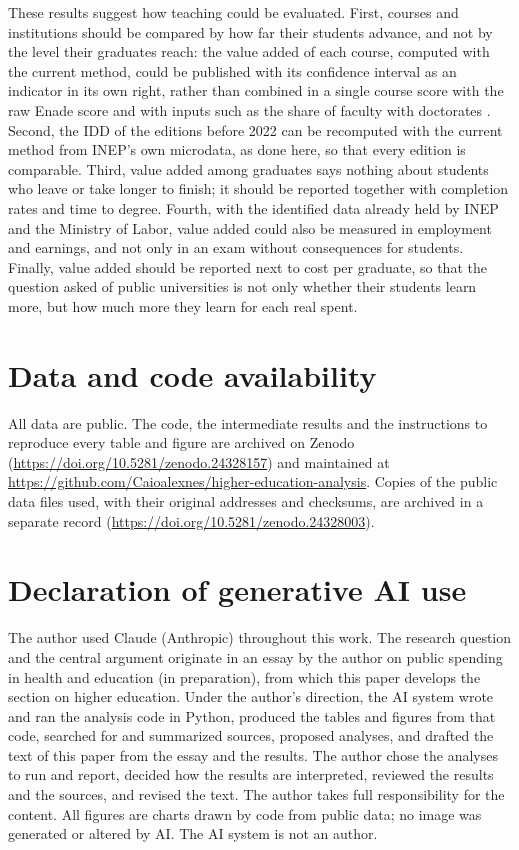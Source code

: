 \documentclass[12pt,letterpaper]{article}
\begin{document}
These results suggest how teaching could be evaluated. First, courses and institutions should be compared by how far their students advance, and not by the level their graduates reach: the value added of each course, computed with the current method, could be published with its confidence interval as an indicator in its own right, rather than combined in a single course score with the raw Enade score and with inputs such as the share of faculty with doctorates \citep{inep2023cpc}. Second, the IDD of the editions before 2022 can be recomputed with the current method from INEP's own microdata, as done here, so that every edition is comparable. Third, value added among graduates says nothing about students who leave or take longer to finish; it should be reported together with completion rates and time to degree. Fourth, with the identified data already held by INEP and the Ministry of Labor, value added could also be measured in employment and earnings, and not only in an exam without consequences for students. Finally, value added should be reported next to cost per graduate, so that the question asked of public universities is not only whether their students learn more, but how much more they learn for each real spent.

\section*{Data and code availability}
All data are public. The code, the intermediate results and the instructions to reproduce every table and figure are archived on Zenodo (\url{https://doi.org/10.5281/zenodo.24328157}) and maintained at \url{https://github.com/Caioalexnes/higher-education-analysis}. Copies of the public data files used, with their original addresses and checksums, are archived in a separate record (\url{https://doi.org/10.5281/zenodo.24328003}).

\section*{Declaration of generative AI use}
The author used Claude (Anthropic) throughout this work. The research question and the central argument originate in an essay by the author on public spending in health and education (in preparation), from which this paper develops the section on higher education. Under the author's direction, the AI system wrote and ran the analysis code in Python, produced the tables and figures from that code, searched for and summarized sources, proposed analyses, and drafted the text of this paper from the essay and the results. The author chose the analyses to run and report, decided how the results are interpreted, reviewed the results and the sources, and revised the text. The author takes full responsibility for the content. All figures are charts drawn by code from public data; no image was generated or altered by AI. The AI system is not an author.
\end{document}
